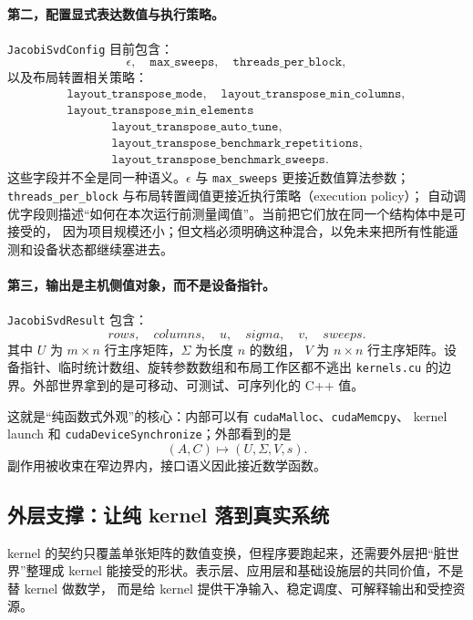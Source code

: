 \paragraph{第二，配置显式表达数值与执行策略。}
\texttt{JacobiSvdConfig} 目前包含：
\[
    \epsilon,\quad
    \texttt{max\_sweeps},\quad
    \texttt{threads\_per\_block},
\]
以及布局转置相关策略：
\[
    \begin{gathered}
        \texttt{layout\_transpose\_mode},\quad
        \texttt{layout\_transpose\_min\_columns},\\
        \texttt{layout\_transpose\_min\_elements}
    \end{gathered}
\]
\[
    \begin{gathered}
        \texttt{layout\_transpose\_auto\_tune},\\
        \texttt{layout\_transpose\_benchmark\_repetitions},\\
        \texttt{layout\_transpose\_benchmark\_sweeps}.
    \end{gathered}
\]
这些字段并不全是同一种语义。\(\epsilon\) 与 \texttt{max\_sweeps} 更接近数值算法参数；
\texttt{threads\_per\_block} 与布局转置阈值更接近执行策略（execution policy）；
自动调优字段则描述“如何在本次运行前测量阈值”。当前把它们放在同一个结构体中是可接受的，
因为项目规模还小；但文档必须明确这种混合，以免未来把所有性能遥测和设备状态都继续塞进去。

\paragraph{第三，输出是主机侧值对象，而不是设备指针。}
\texttt{JacobiSvdResult} 包含：
\[
    rows,\quad columns,\quad u,\quad sigma,\quad v,\quad sweeps.
\]
其中 \(U\) 为 \(m\times n\) 行主序矩阵，\(\Sigma\) 为长度 \(n\) 的数组，
\(V\) 为 \(n\times n\) 行主序矩阵。设备指针、临时统计数组、旋转参数数组和布局工作区都不逃出
\texttt{kernels.cu} 的边界。外部世界拿到的是可移动、可测试、可序列化的 C++ 值。

这就是“纯函数式外观”的核心：内部可以有 \texttt{cudaMalloc}、\texttt{cudaMemcpy}、
kernel launch 和 \texttt{cudaDeviceSynchronize}；外部看到的是
\[
    (A,C)\mapsto(U,\Sigma,V,s).
\]
副作用被收束在窄边界内，接口语义因此接近数学函数。

\subsection{外层支撑：让纯 kernel 落到真实系统}

kernel 的契约只覆盖单张矩阵的数值变换，但程序要跑起来，还需要外层把“脏世界”整理成
kernel 能接受的形状。表示层、应用层和基础设施层的共同价值，不是替 kernel 做数学，
而是给 kernel 提供干净输入、稳定调度、可解释输出和受控资源。

